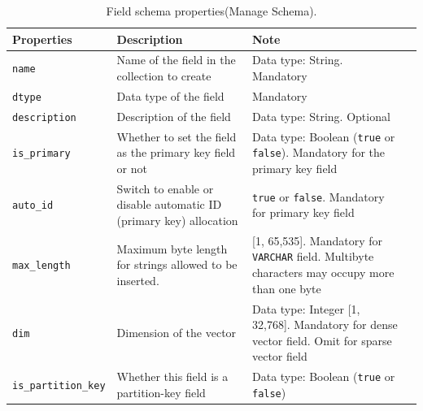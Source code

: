\begin{table}[H]
	\centering
	\label{tab:field_schema_properties}
	\begin{tabular}{p{3cm}p{5.5cm}p{5.5cm}l}
		\hline
		\textbf{Properties}   & \textbf{Description}                                                                 & \textbf{Note}                                                                                                                                         \\ \hline
		\texttt{name}         & Name of the field in the collection to create                                        & Data type: String. Mandatory                                                                                                                         \\ \hline
		\texttt{dtype}        & Data type of the field                                                              & Mandatory                                                                                                                                             \\ \hline
		\texttt{description}  & Description of the field                                                            & Data type: String. Optional                                                                                                                          \\ \hline
		\texttt{is\_primary}  & Whether to set the field as the primary key field or not                            & Data type: Boolean (\texttt{true} or \texttt{false}). Mandatory for the primary key field                                                            \\ \hline
		\texttt{auto\_id}     & Switch to enable or disable automatic ID (primary key) allocation                   & \texttt{true} or \texttt{false}. Mandatory for primary key field                                                                                     \\ \hline
		\texttt{max\_length}  & Maximum byte length for strings allowed to be inserted.                             & {[}1, 65,535{]}. Mandatory for \texttt{VARCHAR} field. Multibyte characters may occupy more than one byte                                            \\ \hline
		\texttt{dim}          & Dimension of the vector                                                            & Data type: Integer {[}1, 32,768{]}. Mandatory for dense vector field. Omit for sparse vector field                                                   \\ \hline
		\texttt{is\_partition\_key} & Whether this field is a partition-key field                                      & Data type: Boolean (\texttt{true} or \texttt{false})                                                                                                \\ \hline
	\end{tabular}
	\caption{Field schema properties(Manage Schema\protect\footnotemark).}
\end{table}

